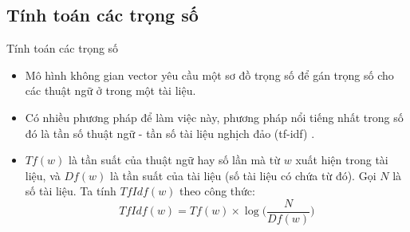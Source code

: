 \documentclass[10pt]{beamer}
\theoremstyle{remark}
\theoremstyle{definition}
\begin{document}
\subsection{Tính toán các trọng số}

\begin{frame}{Tính toán các trọng số}
	\begin{itemize}
		\item Mô hình không gian vector yêu cầu một sơ đồ trọng số để gán trọng số cho các thuật ngữ ở trong một tài liệu.
		\item Có nhiều phương pháp để làm việc này, phương pháp nổi tiếng nhất trong số đó là tần số thuật ngữ - tần số tài liệu nghịch đảo (tf-idf) \cite{355}.
		\item  $Tf(w)$ là tần suất của thuật ngữ hay số lần mà từ $w$ xuất hiện trong tài liệu, và $Df(w)$ là tần suất của tài liệu (số tài liệu có chứa từ đó).
		Gọi $N$ là số tài liệu. Ta tính $TfIdf(w)$ theo công thức:
		\begin{equation}
			TfIdf(w) = Tf(w) \times \log \Big( \dfrac{N}{Df(w)} \Big)
		\end{equation}
	\end{itemize}
\end{frame}
\end{document}
